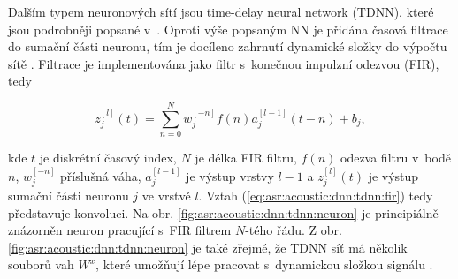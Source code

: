 Dalším typem neuronových sítí jsou time-delay neural network (TDNN), které jsou podrobněji popsané v~\cite{Waibel1989}. Oproti výše popsaným NN je přidána časová filtrace do sumační části neuronu, tím je docíleno zahrnutí dynamické složky do výpočtu sítě \cite{Craig2000}. Filtrace je implementována jako filtr s~konečnou impulzní odezvou (FIR), tedy

\begin{equation}
  z_{j}^{[l]}\left(t\right) = \sum_{n=0}^{N} w_{j}^{[-n]}f\left(n\right)a^{[l-1]}_{j}\left(t - n\right) + b_{j},
  \label{eq:asr:acoustic:dnn:tdnn:fir}
\end{equation}

\noindent kde $t$ je diskrétní časový index, $N$ je délka FIR filtru, $f\left(n\right)$ odezva filtru v~bodě $n$, $w_{j}^{[-n]}$ příslušná váha, $a^{[l-1]}_{j}$ je výstup vrstvy $l-1$ a $z_{j}^{[l]}\left(t\right)$ je výstup sumační části neuronu $j$ ve vrstvě $l$. Vztah (\ref{eq:asr:acoustic:dnn:tdnn:fir}) tedy představuje konvoluci. Na obr. \ref{fig:asr:acoustic:dnn:tdnn:neuron} je principiálně znázorněn neuron pracující s~FIR filtrem $N$-tého řádu. Z obr. \ref{fig:asr:acoustic:dnn:tdnn:neuron} je také zřejmé, že TDNN síť má několik souborů vah $W^{x}$, které umožňují lépe pracovat s~dynamickou složkou signálu \cite{Peddinti2015}.

